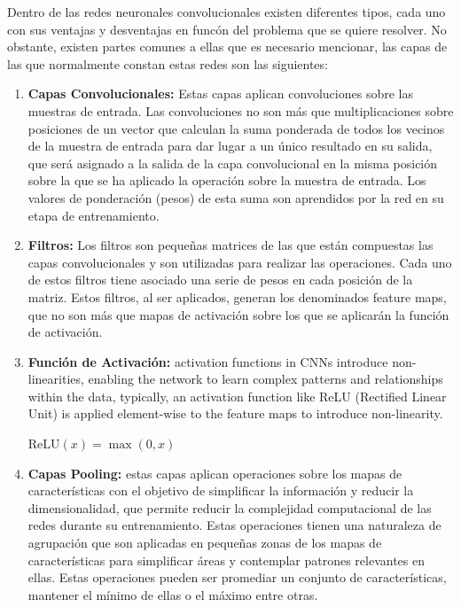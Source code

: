 \documentclass{uathesis-es}
\begin{document}
Dentro de las redes neuronales convolucionales existen diferentes tipos, cada uno con sus ventajas y desventajas en funcón del problema que se quiere resolver. No obstante, existen partes comunes a ellas que es necesario mencionar, las capas de las que normalmente constan estas redes son las siguientes:

\begin{enumerate}
    \item \textbf{Capas Convolucionales:} Estas capas aplican convoluciones sobre las muestras de entrada. Las convoluciones no son más que multiplicaciones sobre posiciones de un vector que calculan la suma ponderada de todos los vecinos de la muestra de entrada para dar lugar a un único resultado en su salida, que será asignado a la salida de la capa convolucional en la misma posición sobre la que se ha aplicado la operación sobre la muestra de entrada. Los valores de ponderación (pesos) de esta suma son aprendidos por la red en su etapa de entrenamiento.
    
    \item \textbf{Filtros:} Los filtros son pequeñas matrices de las que están compuestas las capas convolucionales y son utilizadas para realizar las operaciones. Cada uno de estos filtros tiene asociado una serie de pesos en cada posición de la matriz. Estos filtros, al ser aplicados, generan los denominados feature maps, que no son más que mapas de activación sobre los que se aplicarán la función de activación.
    
    \item \textbf{Función de Activación:} activation functions in CNNs introduce non-linearities, enabling the network to learn complex patterns and relationships within the data, typically, an activation function like ReLU (Rectified Linear Unit) is applied element-wise to the feature maps to introduce non-linearity. \begin{center}
        $\text{ReLU}(x) = \max(0, x)$
    \end{center}
    
    \item \textbf{Capas Pooling:} estas capas aplican operaciones sobre los mapas de características con el objetivo de simplificar la información y reducir la dimensionalidad, que permite reducir la complejidad computacional de las redes durante su entrenamiento. Estas operaciones tienen una naturaleza de agrupación que son aplicadas en pequeñas zonas de los mapas de características para simplificar áreas y contemplar patrones relevantes en ellas. Estas operaciones pueden ser promediar un conjunto de características, mantener el mínimo de ellas o el máximo entre otras.
    

\end{enumerate}
\end{document}
